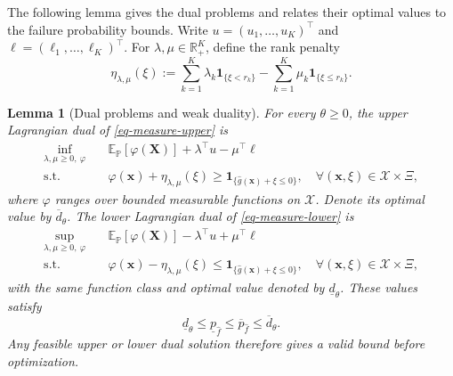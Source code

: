 \documentclass[review,11pt,3p,authoryear,nopreprintline]{elsarticle}
\newtheorem{lemma}{Lemma}
\begin{document}
The following lemma gives the dual problems and relates their optimal values to the failure probability bounds. Write $u=(u_1,\ldots,u_K)^\top$ and $\ell=(\ell_1,\ldots,\ell_K)^\top$. For $\lambda,\mu\in\mathbb R_+^K$, define the rank penalty
\begin{equation}
  \eta_{\lambda,\mu}(\xi):=
  \sum_{k=1}^K\lambda_k\mathbf1_{\{\xi<r_k\}}
  -\sum_{k=1}^K\mu_k\mathbf1_{\{\xi\le r_k\}}.
  \label{eq-dual-step-function}
\end{equation}

\begin{lemma}[Dual problems and weak duality]
  \label{lem-weak-duality}
  For every $\theta\ge0$, the upper Lagrangian dual of \eqref{eq-measure-upper} is
  \begin{equation}
    \begin{aligned}
      \inf_{\lambda,\mu\ge0,\ \varphi}\quad&
      \mathbb E_{\mathbb P}\left[\varphi(\bm X)\right]+\lambda^\top u-\mu^\top\ell\\
      \text{s.t.}\quad&
      \varphi(\bm x)+\eta_{\lambda,\mu}(\xi)\ge\mathbf1_{\{\hat g(\bm x)+\xi\le0\}},
      \quad\forall(\bm x,\xi)\in\mathcal X\times\Xi,
    \end{aligned}
    \label{eq-upper-measure-dual}
  \end{equation}
  where $\varphi$ ranges over bounded measurable functions on $\mathcal X$. Denote its optimal value by $\overline d_\theta$. The lower Lagrangian dual of \eqref{eq-measure-lower} is
  \begin{equation}
    \begin{aligned}
      \sup_{\lambda,\mu\ge0,\ \varphi}\quad&
      \mathbb E_{\mathbb P}\left[\varphi(\bm X)\right]-\lambda^\top u+\mu^\top\ell\\
      \text{s.t.}\quad&
      \varphi(\bm x)-\eta_{\lambda,\mu}(\xi)\le\mathbf1_{\{\hat g(\bm x)+\xi\le0\}},
      \quad\forall(\bm x,\xi)\in\mathcal X\times\Xi,
    \end{aligned}
    \label{eq-lower-measure-dual}
  \end{equation}
  with the same function class and optimal value denoted by $\underline d_\theta$. These values satisfy
  \begin{equation}
    \underline d_\theta\le\underline p_{\hat f}\le\overline p_{\hat f}\le\overline d_\theta.
    \label{eq-weak-duality}
  \end{equation}
  Any feasible upper or lower dual solution therefore gives a valid bound before optimization.
\end{lemma}
\end{document}
